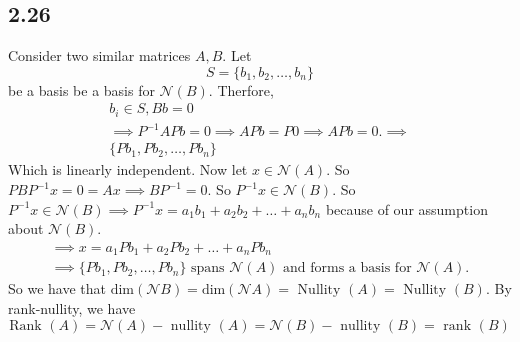 \documentclass[letterpaper,12pt]{article}
\theoremstyle{definition}
\begin{document}
\subsection*{2.26}
Consider two similar matrices $A,B$. Let \[ S = \{b_1,b_2,\dots, b_n\}\]
be a basis be a basis for $\mathscr{N} (B)$. Therfore, 
\begin{align*}
    b_i \in S, Bb = 0 
    \\\implies P^{-1}APb = 0 \implies APb = P0 \implies APb = 0. \implies 
    \\ \{Pb_1,Pb_2,\dots, Pb_n\}
\end{align*}
Which is linearly independent. Now let $x \in \mathscr{N} (A)$. So $PBP^{-1}x = 0 = Ax \implies BP^{-1} = 0.$ So $P^{-1} x\in \mathscr{N} (B)$. So $P^{-1}x \in \mathscr{N} (B) \implies P^{-1}x = a_1b_1 + a_2b_2 + \dots + a_nb_n$
because of our assumption about $\mathscr{N} (B)$. 
\begin{align*}
    \implies x = a_1Pb_1 +a_2Pb_2 +\dots + a_nPb_n \\\implies  \{Pb_1,Pb_2,\dots, Pb_n\} \text{ spans } \mathscr{N} (A) \text{ and forms a basis for } \mathscr{N} (A).
\end{align*}
So we have that $\text{dim} (\mathscr{N} B) = \text{dim} (\mathscr{N} A) = \text{ Nullity } (A) = \text{ Nullity } (B)$. By rank-nullity, we have 
\[ \text{Rank } (A) = \mathscr{N} (A) - \text{ nullity } (A) = \mathscr{N} (B) - \text{ nullity } (B) = \text{ rank } (B)\]
\end{document}
